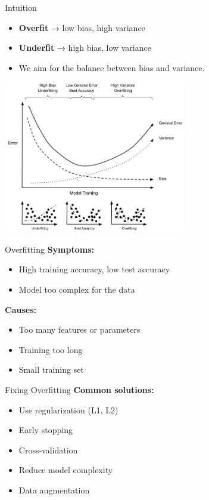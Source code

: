 \documentclass{beamer}
\begin{document}
\begin{frame}{Intuition}
  \small
  \begin{itemize}
    \item \textbf{Overfit} → low bias, high variance
    \item \textbf{Underfit} → high bias, low variance
    \item We aim for the balance between bias and variance.
  \end{itemize}
  \vspace{1em}
  \begin{center}
    \includegraphics[width=0.6\textwidth]{Bias-Variance+Tradeoff.png}
  \end{center}
\end{frame}

\begin{frame}{Overfitting}
  \textbf{Symptoms:}
  \begin{itemize}
    \item High training accuracy, low test accuracy
    \item Model too complex for the data
  \end{itemize}
  \vspace{0.5em}
  \textbf{Causes:}
  \begin{itemize}
    \item Too many features or parameters
    \item Training too long
    \item Small training set
  \end{itemize}
\end{frame}

\begin{frame}{Fixing Overfitting}
  \textbf{Common solutions:}
  \begin{itemize}
    \item Use regularization (L1, L2)
    \item Early stopping
    \item Cross-validation
    \item Reduce model complexity
    \item Data augmentation
  \end{itemize}
\end{frame}
\end{document}
